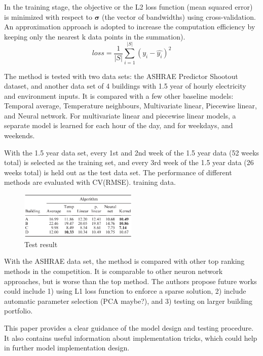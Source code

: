 \documentclass[12pt]{article}
\begin{document}
In the training stage, the objective or the L2 loss function (mean
squared error) is minimized with respect to $\mathbf{\sigma}$ (the
vector of bandwidths) using cross-validation. An approximation
approach is adopted to increase the computation efficiency by keeping
only the nearest k data points in the summation). 
\begin{equation}
  \label{eq:l2}
  loss = \frac{1}{\left|S\right|}\sum_{i = 1}^{\left|S\right|}(y_i - \hat{y_i})^2
\end{equation}

The method is tested with two data sets: the ASHRAE Predictor Shootout
dataset, and another data set of 4 buildings with 1.5 year of hourly
electricity and environment inputs. It is compared with a few other
baseline models: Temporal average, Temperature neighbours,
Multivariate linear, Piecewise linear, and Neural network. For
multivariate linear and piecewise linear models, a separate model is
learned for each hour of the day, and for weekdays, and weekends. 

With the 1.5 year data set, every 1st and 2nd week of the 1.5 year
data (52 weeks total) is selected as the training set, and every 3rd
week of the 1.5 year data (26 weeks total) is held out as the test
data set. The performance of different methods are evaluated with
CV(RMSE).
training data.
\begin{figure}[h!]
  \centering
  \includegraphics[width=0.5\textwidth]{images/kernelResultCmp.png}
  \caption{Test result}
  \label{fig:ker}
\end{figure}

With the ASHRAE data set, the method is compared with other top
ranking methods in the competition. It is comparable to other neuron
network approaches, but is worse than the top method. The authors
propose future works could include 1) using L1 loss function to
enforce a sparse solution, 2) include automatic parameter selection
(PCA maybe?), and 3) testing on larger building portfolio.

This paper provides a clear guidance of the model design and testing
procedure. It also contains useful information about implementation
tricks, which could help in further model implementation design.
\end{document}
